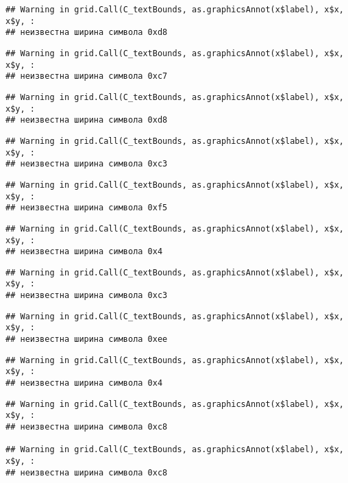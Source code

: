 \documentclass[
]{article}
\begin{document}
\begin{verbatim}
## Warning in grid.Call(C_textBounds, as.graphicsAnnot(x$label), x$x, x$y, :
## неизвестна ширина символа 0xd8
\end{verbatim}

\begin{verbatim}
## Warning in grid.Call(C_textBounds, as.graphicsAnnot(x$label), x$x, x$y, :
## неизвестна ширина символа 0xc7
\end{verbatim}

\begin{verbatim}
## Warning in grid.Call(C_textBounds, as.graphicsAnnot(x$label), x$x, x$y, :
## неизвестна ширина символа 0xd8
\end{verbatim}

\begin{verbatim}
## Warning in grid.Call(C_textBounds, as.graphicsAnnot(x$label), x$x, x$y, :
## неизвестна ширина символа 0xc3
\end{verbatim}

\begin{verbatim}
## Warning in grid.Call(C_textBounds, as.graphicsAnnot(x$label), x$x, x$y, :
## неизвестна ширина символа 0xf5
\end{verbatim}

\begin{verbatim}
## Warning in grid.Call(C_textBounds, as.graphicsAnnot(x$label), x$x, x$y, :
## неизвестна ширина символа 0x4
\end{verbatim}

\begin{verbatim}
## Warning in grid.Call(C_textBounds, as.graphicsAnnot(x$label), x$x, x$y, :
## неизвестна ширина символа 0xc3
\end{verbatim}

\begin{verbatim}
## Warning in grid.Call(C_textBounds, as.graphicsAnnot(x$label), x$x, x$y, :
## неизвестна ширина символа 0xee
\end{verbatim}

\begin{verbatim}
## Warning in grid.Call(C_textBounds, as.graphicsAnnot(x$label), x$x, x$y, :
## неизвестна ширина символа 0x4
\end{verbatim}

\begin{verbatim}
## Warning in grid.Call(C_textBounds, as.graphicsAnnot(x$label), x$x, x$y, :
## неизвестна ширина символа 0xc8

## Warning in grid.Call(C_textBounds, as.graphicsAnnot(x$label), x$x, x$y, :
## неизвестна ширина символа 0xc8
\end{verbatim}
\end{document}
